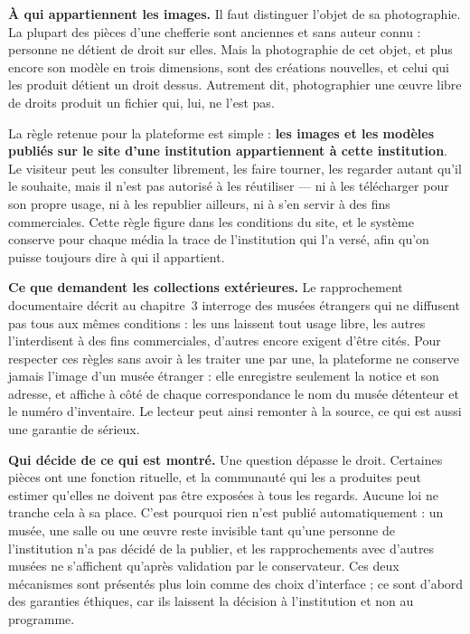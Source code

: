 \textbf{À qui appartiennent les images.} Il faut distinguer l'objet de sa
photographie. La plupart des pièces d'une chefferie sont anciennes et sans
auteur connu : personne ne détient de droit sur elles. Mais la photographie de
cet objet, et plus encore son modèle en trois dimensions, sont des créations
nouvelles, et celui qui les produit détient un droit dessus. Autrement dit,
photographier une œuvre libre de droits produit un fichier qui, lui, ne l'est
pas.

La règle retenue pour la plateforme est simple : \textbf{les images et les
modèles publiés sur le site d'une institution appartiennent à cette
institution}. Le visiteur peut les consulter librement, les faire tourner, les
regarder autant qu'il le souhaite, mais il n'est pas autorisé à les
réutiliser — ni à les télécharger pour son propre usage, ni à les republier
ailleurs, ni à s'en servir à des fins commerciales. Cette règle figure dans les
conditions du site, et le système conserve pour chaque média la trace de
l'institution qui l'a versé, afin qu'on puisse toujours dire à qui il
appartient.

\textbf{Ce que demandent les collections extérieures.} Le rapprochement
documentaire décrit au chapitre~3 interroge des musées étrangers qui ne
diffusent pas tous aux mêmes conditions : les uns laissent tout usage libre, les
autres l'interdisent à des fins commerciales, d'autres encore exigent d'être
cités. Pour respecter ces règles sans avoir à les traiter une par une, la
plateforme ne conserve jamais l'image d'un musée étranger : elle enregistre
seulement la notice et son adresse, et affiche à côté de chaque correspondance
le nom du musée détenteur et le numéro d'inventaire. Le lecteur peut ainsi
remonter à la source, ce qui est aussi une garantie de sérieux.

\textbf{Qui décide de ce qui est montré.} Une question dépasse le droit.
Certaines pièces ont une fonction rituelle, et la communauté qui les a produites
peut estimer qu'elles ne doivent pas être exposées à tous les regards. Aucune
loi ne tranche cela à sa place. C'est pourquoi rien n'est publié
automatiquement : un musée, une salle ou une œuvre reste invisible tant qu'une
personne de l'institution n'a pas décidé de la publier, et les rapprochements
avec d'autres musées ne s'affichent qu'après validation par le conservateur. Ces
deux mécanismes sont présentés plus loin comme des choix d'interface ; ce sont
d'abord des garanties éthiques, car ils laissent la décision à l'institution et
non au programme.

